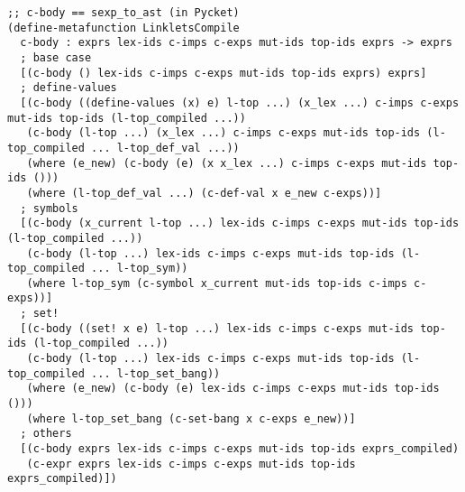 \begin{lstlisting}[language=pltredex,
                basicstyle=\ttfamily\scriptsize,
                numbers=none, xleftmargin=2em]
;; c-body == sexp_to_ast (in Pycket)
(define-metafunction LinkletsCompile
  c-body : exprs lex-ids c-imps c-exps mut-ids top-ids exprs -> exprs
  ; base case
  [(c-body () lex-ids c-imps c-exps mut-ids top-ids exprs) exprs]
  ; define-values
  [(c-body ((define-values (x) e) l-top ...) (x_lex ...) c-imps c-exps mut-ids top-ids (l-top_compiled ...))
   (c-body (l-top ...) (x_lex ...) c-imps c-exps mut-ids top-ids (l-top_compiled ... l-top_def_val ...))
   (where (e_new) (c-body (e) (x x_lex ...) c-imps c-exps mut-ids top-ids ()))
   (where (l-top_def_val ...) (c-def-val x e_new c-exps))]
  ; symbols
  [(c-body (x_current l-top ...) lex-ids c-imps c-exps mut-ids top-ids (l-top_compiled ...))
   (c-body (l-top ...) lex-ids c-imps c-exps mut-ids top-ids (l-top_compiled ... l-top_sym))
   (where l-top_sym (c-symbol x_current mut-ids top-ids c-imps c-exps))]
  ; set!
  [(c-body ((set! x e) l-top ...) lex-ids c-imps c-exps mut-ids top-ids (l-top_compiled ...))
   (c-body (l-top ...) lex-ids c-imps c-exps mut-ids top-ids (l-top_compiled ... l-top_set_bang))
   (where (e_new) (c-body (e) lex-ids c-imps c-exps mut-ids top-ids ()))
   (where l-top_set_bang (c-set-bang x c-exps e_new))]
  ; others
  [(c-body exprs lex-ids c-imps c-exps mut-ids top-ids exprs_compiled)
   (c-expr exprs lex-ids c-imps c-exps mut-ids top-ids exprs_compiled)])


\end{lstlisting}

